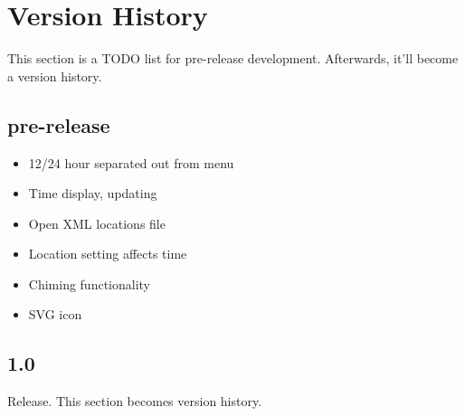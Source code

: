 \section{Version History}

This section is a TODO list for pre-release development. Afterwards, it'll become a version history.

\subsection{pre-release}
\begin{itemize}
    \item 12/24 hour separated out from menu
    \item Time display, updating
    \item Open XML locations file
    \item Location setting affects time
    \item Chiming functionality
    \item SVG icon
\end{itemize}
\subsection{1.0}

Release. This section becomes version history.

